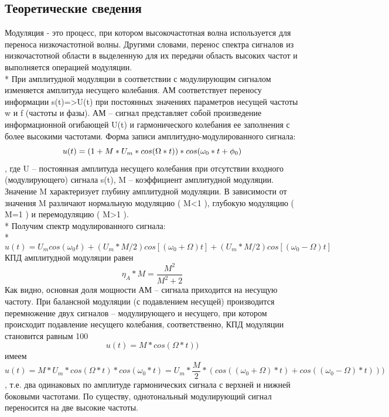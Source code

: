 \documentclass[10pt,a4paper]{article}
\begin{document}
\subsection{Теоретические сведения}
Модуляция - это процесс, при котором высокочастотная волна используется для переноса низкочастотной волны. Другими словами, перенос спектра сигналов из низкочастотной области в выделенную для их передачи область высоких частот и выполняется операцией модуляции.\\*
При амплитудной модуляции в соответствии с модулирующим сигналом изменяется амплитуда несущего колебания. АМ соответствует переносу информации s(t)=>U(t) при постоянных значениях параметров несущей частоты w и f (частоты и фазы). АМ – сигнал представляет собой произведение информационной огибающей U(t)  и гармонического колебания ее заполнения с более высокими частотами.
Форма записи амплитудно-модулированного сигнала:
\begin{displaymath}
u(t)=(1+M*U_{m}*cos(\Omega*t))*cos(\omega_{0}*t+\phi_{0})\newline
\end{displaymath}
, где U – постоянная амплитуда несущего колебания при отсутствии входного (модулирующего) сигнала s(t), M  – коэффициент амплитудной модуляции. Значение  M характеризует глубину амплитудной модуляции. В зависимости от значения  M различают нормальную модуляцию ( M<1 ), глубокую модуляцию ( M=1 ) и перемодуляцию ( M>1 ).\\*
Получим спектр модулированного сигнала:\\*
$$ u(t) = U_m cos(\omega_0 t) + (U_m * M/2)cos[(\omega_0 + \Omega)t] + (U_m * M/2)cos[(\omega_0 - \Omega)t] $$
КПД амплитудной модуляции равен 
\begin{displaymath}
\eta_{A}*M=\frac{M^{2}}{M^{2}+2}
\end{displaymath}
Как видно, основная доля мощности АМ – сигнала приходится на несущую частоту. При балансной модуляции (с подавлением несущей) производится перемножение двух сигналов – модулирующего и несущего, при котором происходит подавление несущего колебания, соответственно, КПД модуляции становится равным 100%
\begin{displaymath}
u(t)=M*cos(\Omega*t))
\end{displaymath}  имеем
\begin{displaymath}
u(t)=M*U_{m}*cos(\Omega*t)*cos(\omega_{0}*t)=U_{m}*\frac{M}{2}*(cos((\omega_{0}+\Omega)*t)+cos((\omega_{0}-\Omega)*t)))
\end{displaymath}
 , т.е. два одинаковых по амплитуде гармонических сигнала с верхней и нижней боковыми частотами. По существу, однотональный модулирующий сигнал переносится на две высокие частоты.
\end{document}
